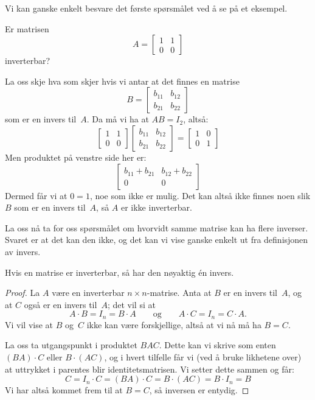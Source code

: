 Vi kan ganske enkelt besvare det første spørsmålet ved å se på et
eksempel.

\begin{ex}
Er matrisen
\[
A =
\begin{bmatrix}
1 & 1 \\
0 & 0
\end{bmatrix}
\]
inverterbar?

La oss skje hva som skjer hvis vi antar at det finnes en matrise
\[
B =
\begin{bmatrix}
b_{11} & b_{12} \\
b_{21} & b_{22}
\end{bmatrix}
\]
som er en invers til~$A$.  Da må vi ha at $AB = I_2$, altså:
\[
\begin{bmatrix}
1 & 1 \\
0 & 0
\end{bmatrix}
\begin{bmatrix}
b_{11} & b_{12} \\
b_{21} & b_{22}
\end{bmatrix}
=
\begin{bmatrix}
1 & 0 \\
0 & 1
\end{bmatrix}
\]
Men produktet på venstre side her er:
\[
\begin{bmatrix}
b_{11} + b_{21} & b_{12} + b_{22} \\
0               & 0
\end{bmatrix}
\]
Dermed får vi at $0 = 1$, noe som ikke er mulig.  Det kan altså ikke
finnes noen slik $B$ som er en invers til~$A$, så $A$ er ikke
inverterbar.
\end{ex}

La oss nå ta for oss spørsmålet om hvorvidt samme matrise kan ha flere
inverser.  Svaret er at det kan den ikke, og det kan vi vise ganske
enkelt ut fra definisjonen av invers.

\begin{thm}
Hvis en matrise er inverterbar, så har den nøyaktig én invers.
\end{thm}
\begin{proof}
La $A$ være en inverterbar $n \times n$-matrise.  Anta at $B$ er en
invers til~$A$, og at $C$ også er en invers til~$A$; det vil si at
\[
A \cdot B = I_n = B \cdot A
\qquad\text{og}\qquad
A \cdot C = I_n = C \cdot A.
\]
Vi vil vise at $B$ og~$C$ ikke kan være forskjellige, altså at vi nå
må ha $B = C$.

La oss ta utgangspunkt i produktet $BAC$.  Dette kan vi skrive som
enten $(BA) \cdot C$ eller $B \cdot (AC)$, og i hvert tilfelle får vi
(ved å bruke likhetene over) at uttrykket i parentes blir
identitetsmatrisen.  Vi setter dette sammen og får:
\[
C
 = I_n \cdot C
 = (BA) \cdot C
 = B \cdot (AC)
 = B \cdot I_n
 = B
\]
Vi har altså kommet frem til at $B = C$, så inversen er entydig.
\end{proof}


